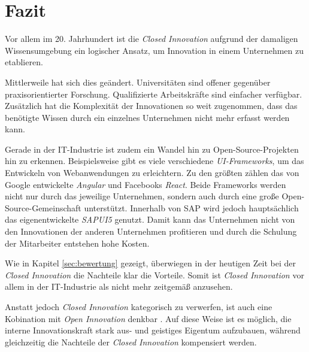 \section{Fazit}\label{sec:fazit}
Vor allem im 20. Jahrhundert ist die \textit{Closed Innovation}
aufgrund der damaligen Wissensumgebung ein logischer Ansatz,
um Innovation in einem Unternehmen zu etablieren.

Mittlerweile hat sich dies geändert.
Universitäten sind offener gegenüber praxisorientierter Forschung.
Qualifizierte Arbeitskräfte sind einfacher verfügbar.
Zusätzlich hat die Komplexität der Innovationen so weit zugenommen,
dass das benötigte Wissen durch ein einzelnes Unternehmen nicht mehr erfasst werden kann.

Gerade in der IT-Industrie ist zudem ein Wandel hin zu Open-Source-Projekten hin zu erkennen.
Beispielsweise gibt es viele verschiedene \linebreak{}\textit{UI-Frameworks}, um das Entwickeln von Webanwendungen zu erleichtern.
Zu den größten zählen das von Google entwickelte \textit{Angular} und Facebooks \textit{React}.
Beide Frameworks werden nicht nur durch das jeweilige Unternehmen,
sondern auch durch eine große Open-Source-Gemeinschaft unterstützt.
Innerhalb von SAP wird jedoch hauptsächlich das eigenentwickelte \textit{SAPUI5} genutzt.
Damit kann das Unternehmen nicht von den Innovationen der anderen Unternehmen profitieren und
durch die Schulung der Mitarbeiter entstehen hohe Kosten.

Wie in Kapitel \ref{sec:bewertung} gezeigt, überwiegen in der heutigen Zeit bei der \textit{Closed Innovation}
die Nachteile klar die Vorteile.
Somit ist \textit{Closed Innovation} vor allem in der IT-Industrie als nicht mehr zeitgemäß anzusehen.

Anstatt jedoch \textit{Closed Innovation} kategorisch zu verwerfen,
ist auch eine Kobination mit \textit{Open Innovation} denkbar \cite{OpenInno32:online}.
Auf diese Weise ist es möglich, die interne Innovationskraft stark aus- und geistiges Eigentum aufzubauen,
während gleichzeitig die Nachteile der \textit{Closed Innovation} kompensiert werden.
